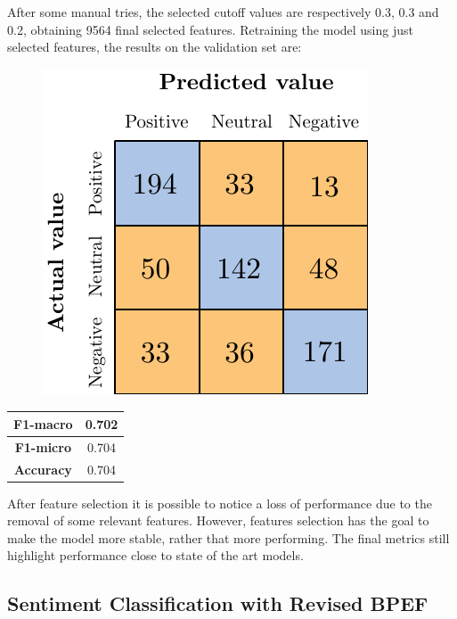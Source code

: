 
After some manual tries, the selected cutoff values are respectively 0.3, 0.3 and 0.2, obtaining 9564 final selected features. Retraining the model using just selected features, the results on the validation set are:%


\begin{figure}[H]
	\centering
	\includegraphics[scale=1]{figures/conf_matrices/twitter_snt_svm/twitter_snt_svm_afs.pdf}
	\label{fig:tw_snt_svm_afs}
\end{figure}

\begin{center}
	\begin{tabular}{ | c | c | } 
		\hline
		\textbf{F1-macro} & 0.702 \\
		\hline
		\textbf{F1-micro} & 0.704 \\ 
		\hline
		\textbf{Accuracy} & 0.704 \\ 
		\hline
	\end{tabular}
\end{center}

After feature selection it is possible to notice a loss of performance due to the removal of some relevant features. However, features selection has the goal to make the model more stable, rather that more performing. The final metrics still highlight performance close to state of the art models.


\subsection{Sentiment Classification with Revised BPEF}

